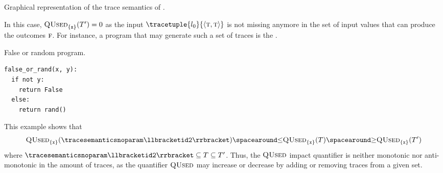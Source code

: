 \begin{example}
\begin{marginfigure}[*-6]
\caption{Graphical representation of the trace semantics of .}
\end{marginfigure}
In this case, $\textup{\textsc{QUsed}}_{\{\texttt{x} \}}(T')=0$ as the input $\tracetuple{\locinit}{\langle \true, \true\rangle}$ is not missing anymore in the set of input values that can produce the outcomes $\textsc{f}$.
For instance, a program that may generate such a set of traces is the .
\begin{marginlisting}
  \caption{False or random program.}
  \vspace{15pt}
\begin{lstlisting}[style=mystyle,language=customPython]
false_or_rand(x, y):
  if not y:
    return False
  else:
    return rand()
 \end{lstlisting}
\end{marginlisting}
This example shows that \[\qusedname_{\{\texttt{x} \}}(\tracesemanticsnoparam\semanticsof{\texttt{id2}}) \LE \qusedname_{\{\texttt{x} \}}(\defsetoftraces) \GE \qusedname_{\{\texttt{x} \}}(\defsetoftraces')\] where $\tracesemanticsnoparam\semanticsof{\texttt{id2}} \subseteq \defsetoftraces \subseteq \defsetoftraces'$.
Thus, the $\textup{\textsc{QUsed}}$ impact quantifier is neither monotonic nor anti-monotonic in the amount of traces, as the quantifier $\textup{\textsc{QUsed}}$ may increase or decrease by adding or removing traces from a given set.
\end{example}






